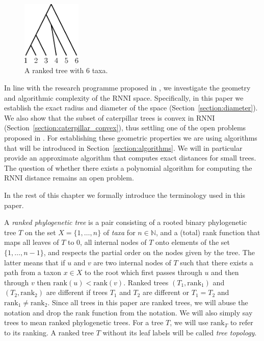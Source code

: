 \documentclass{amsart}
\newcommand{\rank}{\mathrm{rank}}
\newcommand{\rnni}{\mathrm{RNNI}}
\begin{document}
\begin{figure}[H]
\centering
\includegraphics[width=0.25\textwidth]{ranked_tree}
\vspace{12pt}
\caption{A ranked tree with $6$ taxa.}
\label{fig:ranked_tree}
\end{figure}

In line with the research programme proposed in \autocite{Gavryushkin2018-ol}, we investigate the geometry and algorithmic complexity of the $\rnni$ space.
Specifically, in this paper we establish the exact radius and diameter of the space (Section~\ref{section:diameter}).
We also show that the subset of caterpillar trees is convex in $\rnni$ (Section~\ref{section:caterpillar_convex}), thus settling one of the open problems proposed in \autocite{Gavryushkin2018-ol}.
For establishing these geometric properties we are using algorithms that will be introduced in Section~\ref{section:algorithms}.
We will in particular provide an approximate algorithm that computes exact distances for small trees.
The question of whether there exists a polynomial algorithm for computing the $\rnni$ distance remains an open problem.

In the rest of this chapter we formally introduce the terminology used in this paper.

A \emph{ranked phylogenetic tree} is a pair consisting of a rooted binary phylogenetic tree $T$ on the set $X = \{1, \ldots, n\}$ of \emph{taxa} for $n \in \mathbb N$, and a (total) rank function that maps all leaves of $T$ to $0$, all internal nodes of $T$ onto elements of the set $\{1, \ldots, n-1\}$, and respects the partial order on the nodes given by the tree.
The latter means that if $u$ and $v$ are two internal nodes of $T$ such that there exists a path from a taxon $x \in X$ to the root which first passes through $u$ and then through $v$ then $\rank(u) < \rank(v)$.
Ranked trees $(T_1, \rank_1)$ and $(T_2, \rank_2)$ are different if trees $T_1$ and $T_2$ are different or $T_1 = T_2$ and $\rank_1 \neq \rank_2$.
Since all trees in this paper are ranked trees, we will abuse the notation and drop the rank function from the notation.
We will also simply say trees to mean ranked phylogenetic trees.
For a tree $T$, we will use $\rank_T$ to refer to its ranking.
A ranked tree $T$ without its leaf labels will be called \emph{tree topology}.
\end{document}

